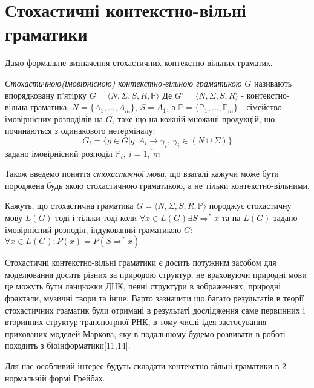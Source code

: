 \section{Стохастичні контекстно-вільні граматики}
 Дамо формальне визначення стохастичних контекстно-вільних граматик.
\begin{definition}
  \textit{Стохастичною(імовірнісною) контекстно-вільною граматикою} $ G $ називають впорядковану п'ятірку
  $ G = \big\langle N, \Sigma, S, R, \mathbb{P}\big\rangle $ Де $ G' = \big\langle N, \Sigma, S, R\big\rangle $ - контекстно-вільна граматика,
  $N = \{A_1,\dots,A_m \}$, $S = A_1$, а $\mathbb{P} = \{ \mathbb{P}_1,\dots,\mathbb{P}_m \}$ - сімейство імовірнісних розподілів на $G$,
  таке що на кожній множині продукцій, що починаються з одинакового нетерміналу:
  $$ G_i = \{ g \in G | g\colon A_i \rightarrow \gamma_i,\ \gamma_i \in \left(N \cup \Sigma \right) \} $$
  задано імовірнісний розподіл $\mathbb{P}_i,\ i = \overline{1,\ m}$
\end{definition}
Також введемо поняття \textit{стохастичної мови}, що взагалі кажучи може бути породжена будь якою стохастичною граматикою, а не тільки контекстно-вільними.
\begin{definition}
  Кажуть, що стохастична граматика $ G = \big\langle N, \Sigma, S, R, \mathbb{P}\big\rangle $ породжує стохастичну мову $ L(G) $ тоді і тільки тоді коли $ \forall x \in L(G) \exists S \Rightarrow^* x $ та на $ L(G) $ задано імовірнісний розподіл, індукований граматикою $ G $: $ \forall x \in L(G) \colon P(x) = P(S \Rightarrow^* x) $
\end{definition}

Стохастичні контекстно-вільні граматики є досить потужним засобом для моделювання досить різних за природою структур, не враховуючи природні мови це можуть бути ланцюжки ДНК, певні структури в зображеннях, природні фрактали, музичні твори та інше. Варто зазначити що багато результатів в теорії стохастичних граматик були отримані в результаті дослідження саме первинних і вторинних структур транспотрної РНК, в тому числі ідея застосування прихованих моделей Маркова, яку в подальшому будемо розвивати в роботі походить з біоінформатики[11,14].

Для нас особливий інтерес будуть складати контекстно-вільні граматики в 2-нормальній формі Грейбах.

